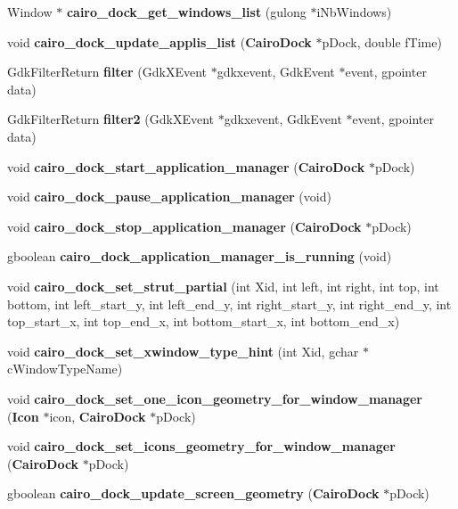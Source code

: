 \begin{CompactItemize}
\item 
Window $\ast$ {\bf cairo\_\-dock\_\-get\_\-windows\_\-list} (gulong $\ast$i\-Nb\-Windows)
\item 
void {\bf cairo\_\-dock\_\-update\_\-applis\_\-list} ({\bf Cairo\-Dock} $\ast$p\-Dock, double f\-Time)
\item 
Gdk\-Filter\-Return {\bf filter} (Gdk\-XEvent $\ast$gdkxevent, Gdk\-Event $\ast$event, gpointer data)
\item 
Gdk\-Filter\-Return {\bf filter2} (Gdk\-XEvent $\ast$gdkxevent, Gdk\-Event $\ast$event, gpointer data)
\item 
void {\bf cairo\_\-dock\_\-start\_\-application\_\-manager} ({\bf Cairo\-Dock} $\ast$p\-Dock)
\item 
void {\bf cairo\_\-dock\_\-pause\_\-application\_\-manager} (void)
\item 
void {\bf cairo\_\-dock\_\-stop\_\-application\_\-manager} ({\bf Cairo\-Dock} $\ast$p\-Dock)
\item 
gboolean {\bf cairo\_\-dock\_\-application\_\-manager\_\-is\_\-running} (void)
\item 
void {\bf cairo\_\-dock\_\-set\_\-strut\_\-partial} (int Xid, int left, int right, int top, int bottom, int left\_\-start\_\-y, int left\_\-end\_\-y, int right\_\-start\_\-y, int right\_\-end\_\-y, int top\_\-start\_\-x, int top\_\-end\_\-x, int bottom\_\-start\_\-x, int bottom\_\-end\_\-x)
\item 
void {\bf cairo\_\-dock\_\-set\_\-xwindow\_\-type\_\-hint} (int Xid, gchar $\ast$c\-Window\-Type\-Name)
\item 
void {\bf cairo\_\-dock\_\-set\_\-one\_\-icon\_\-geometry\_\-for\_\-window\_\-manager} ({\bf Icon} $\ast$icon, {\bf Cairo\-Dock} $\ast$p\-Dock)
\item 
void {\bf cairo\_\-dock\_\-set\_\-icons\_\-geometry\_\-for\_\-window\_\-manager} ({\bf Cairo\-Dock} $\ast$p\-Dock)
\item 
gboolean {\bf cairo\_\-dock\_\-update\_\-screen\_\-geometry} ({\bf Cairo\-Dock} $\ast$p\-Dock)
\end{CompactItemize}
